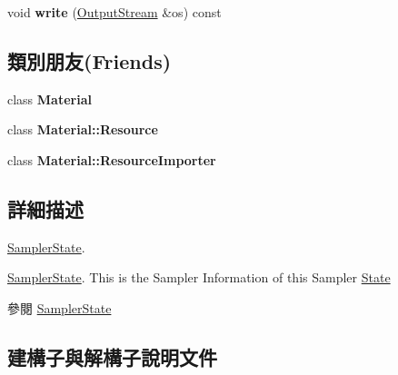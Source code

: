 \begin{DoxyCompactItemize}
\item 
void {\bfseries write} (\hyperlink{class_i_dream_sky_1_1_output_stream}{Output\+Stream} \&os) const \hypertarget{class_i_dream_sky_1_1_material_1_1_sampler_state_abeab7142d4b1b5757d7d9d69ee984210}{}\label{class_i_dream_sky_1_1_material_1_1_sampler_state_abeab7142d4b1b5757d7d9d69ee984210}

\end{DoxyCompactItemize}
\subsection*{類別朋友(Friends)}
\begin{DoxyCompactItemize}
\item 
class {\bfseries Material}\hypertarget{class_i_dream_sky_1_1_material_1_1_sampler_state_aa1212b6e372a0f45d2c01f3cd203af77}{}\label{class_i_dream_sky_1_1_material_1_1_sampler_state_aa1212b6e372a0f45d2c01f3cd203af77}

\item 
class {\bfseries Material\+::\+Resource}\hypertarget{class_i_dream_sky_1_1_material_1_1_sampler_state_a6a002bcee6c883089769545352e9ccbd}{}\label{class_i_dream_sky_1_1_material_1_1_sampler_state_a6a002bcee6c883089769545352e9ccbd}

\item 
class {\bfseries Material\+::\+Resource\+Importer}\hypertarget{class_i_dream_sky_1_1_material_1_1_sampler_state_a941a71e735085112a8496c27836506ee}{}\label{class_i_dream_sky_1_1_material_1_1_sampler_state_a941a71e735085112a8496c27836506ee}

\end{DoxyCompactItemize}


\subsection{詳細描述}
\hyperlink{class_i_dream_sky_1_1_material_1_1_sampler_state}{Sampler\+State}. 

\hyperlink{class_i_dream_sky_1_1_material_1_1_sampler_state}{Sampler\+State}. This is the Sampler Information of this Sampler \hyperlink{class_i_dream_sky_1_1_state}{State} \begin{DoxySeeAlso}{參閱}
\hyperlink{class_i_dream_sky_1_1_material_1_1_sampler_state}{Sampler\+State} 
\end{DoxySeeAlso}


\subsection{建構子與解構子說明文件}
